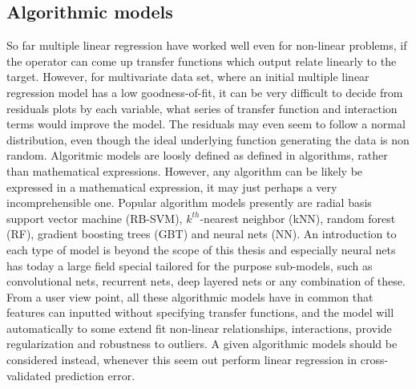 \subsection{Algorithmic models}
So far multiple linear regression have worked well even for non-linear problems, if the operator can come up transfer functions which output relate linearly to the target. However, for multivariate data set, where an initial multiple linear regression model has a low goodness-of-fit, it can be very difficult to decide from residuals plots by each variable, what series of transfer function and interaction terms would improve the model. The residuals may even seem to follow a normal distribution, even though the ideal underlying function generating the data is non random. Algoritmic models are loosly defined as defined in algorithms, rather than mathematical expressions. However, any algorithm can be likely be expressed in a mathematical expression, it may just perhaps a very incomprehensible one. Popular algorithm models presently are radial basis support vector machine (RB-SVM), $k^{th}$-nearest neighbor (kNN), random forest (RF), gradient boosting trees (GBT) and neural nets (NN). An introduction to each type of model is beyond the scope of this thesis and especially neural nets has today a large field special tailored for the purpose sub-models, such as convolutional nets, recurrent nets, deep layered nets or any combination of these. From a user view point, all these algorithmic models have in common that features can inputted without specifying transfer functions, and the model will automatically to some extend fit non-linear relationships, interactions, provide regularization and robustness to outliers. A given algorithmic models should be considered instead, whenever this seem out perform linear regression in cross-validated prediction error.

